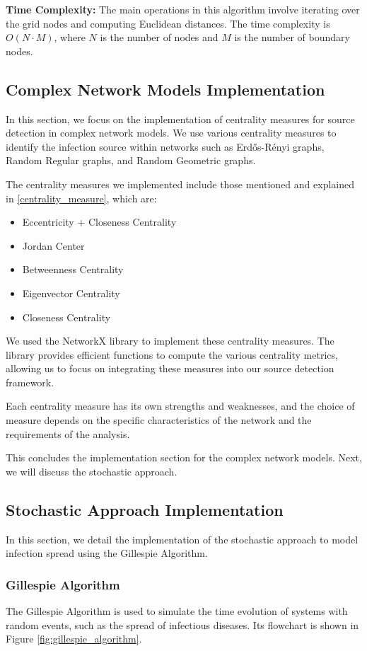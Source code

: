 \textbf{Time Complexity:} The main operations in this algorithm involve iterating over the grid nodes and computing Euclidean distances. The time complexity is \(O(N \cdot M)\), where \(N\) is the number of nodes and \(M\) is the number of boundary nodes.

\subsection{Complex Network Models Implementation}
In this section, we focus on the implementation of centrality measures for source detection in complex network models. We use various centrality measures to identify the infection source within networks such as Erdős-Rényi graphs, Random Regular graphs, and Random Geometric graphs.

The centrality measures we implemented include those mentioned and explained in \ref{centrality_measure}, which are:

\begin{itemize}
    \item Eccentricity + Closeness Centrality
    \item Jordan Center
    \item Betweenness Centrality
    \item Eigenvector Centrality
    \item Closeness Centrality
\end{itemize}

We used the NetworkX library to implement these centrality measures. The library provides efficient functions to compute the various centrality metrics, allowing us to focus on integrating these measures into our source detection framework.

 Each centrality measure has its own strengths and weaknesses, and the choice of measure depends on the specific characteristics of the network and the requirements of the analysis.

This concludes the implementation section for the complex network models. Next, we will discuss the stochastic approach.

\subsection{Stochastic Approach Implementation}
In this section, we detail the implementation of the stochastic approach to model infection spread using the Gillespie Algorithm.

\subsubsection{Gillespie Algorithm}
The Gillespie Algorithm is used to simulate the time evolution of systems with random events, such as the spread of infectious diseases. Its flowchart is shown in Figure \ref{fig:gillespie_algorithm}.

